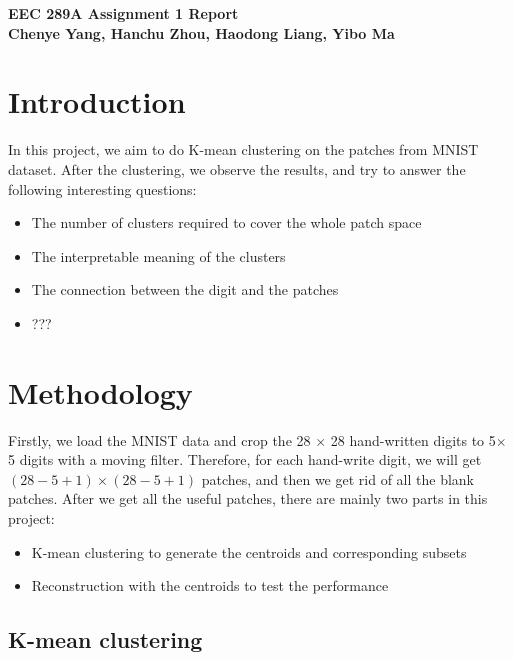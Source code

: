 \documentclass{article}
\begin{document}
\noindent
\textbf{\large EEC 289A Assignment 1 Report} \\
\textbf{\small Chenye Yang, Hanchu Zhou, Haodong Liang, Yibo Ma}


\vspace{2mm}

\section{Introduction}

In this project, we aim to do K-mean clustering on the patches from MNIST dataset. After the clustering, we observe the results, and try to answer the following interesting questions:

\begin{itemize}
    \item The number of clusters required to cover the whole patch space
    \item The interpretable meaning of the clusters
    \item The connection between the digit and the patches
    \item ???
\end{itemize}

\vspace{2mm}

\section{Methodology}

Firstly, we load the MNIST data and crop the 28 $\times$ 28 hand-written digits to 5$\times$ 5 digits with a moving filter. Therefore, for each hand-write digit, we will get $(28 -5 +1) \times (28 - 5 + 1)$ patches, and then we get rid of all the blank patches. After we get all the useful patches, there are mainly two parts in this project:

\begin{itemize}
    \item K-mean clustering to generate the centroids and corresponding subsets
    \item Reconstruction with the centroids to test the performance
\end{itemize}


\vspace{2mm}

\subsection{K-mean clustering}
\end{document}
